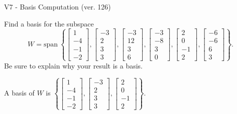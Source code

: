 \begin{exercise}
  \begin{exerciseTitle}V7 - Basis Computation (ver. 126)\end{exerciseTitle}
  \begin{exerciseStatement}
    Find a basis for the subspace 
\[W=\mathrm{span}\ \left\{\left[\begin{array}{r}
1 \\
-4 \\
-1 \\
-2
\end{array}\right] , \left[\begin{array}{r}
-3 \\
2 \\
3 \\
3
\end{array}\right] , \left[\begin{array}{r}
-3 \\
12 \\
3 \\
6
\end{array}\right] , \left[\begin{array}{r}
-3 \\
-8 \\
3 \\
0
\end{array}\right] , \left[\begin{array}{r}
2 \\
0 \\
-1 \\
2
\end{array}\right] , \left[\begin{array}{r}
-6 \\
-6 \\
6 \\
3
\end{array}\right]\right\}.\]
 Be sure to explain why your result is a basis.


  \end{exerciseStatement}
  \begin{exerciseAnswer}
   A basis of \(W\) is  \(\left\{\left[\begin{array}{r}
1 \\
-4 \\
-1 \\
-2
\end{array}\right] , \left[\begin{array}{r}
-3 \\
2 \\
3 \\
3
\end{array}\right] , \left[\begin{array}{r}
2 \\
0 \\
-1 \\
2
\end{array}\right]\right\}\).
  


  \end{exerciseAnswer}
\end{exercise}